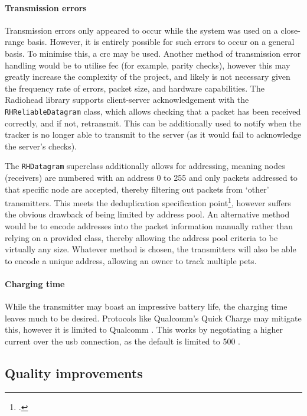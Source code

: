 \paragraph{Transmission errors}
Transmission errors only appeared to occur while the system was
used on a close-range basis. However, it is entirely possible for
such errors to occur on a general basis. To minimise this,
a \acrshort{crc} may be used. Another method of transmission error handling
would be to utilise \acrshort{fec} (for example, parity checks),
however this may greatly increase
the complexity of the project, and likely is not necessary given the
frequency rate of errors, packet size, and hardware capabilities.
The Radiohead library supports client-server acknowledgement
with the \lstinline{RHReliableDatagram} class, which allows
checking that a packet has been received correctly, and if not, retransmit.
This can be additionally used to notify when the tracker is no longer
able to transmit to the server (as it would fail to acknowledge the
server's checks). 

The \lstinline{RHDatagram} superclass additionally allows for addressing, meaning 
nodes (receivers) are numbered with an address 0 to 255 and only packets 
addressed to that specific node are accepted, thereby filtering out packets from 
`other' transmitters. This meets the deduplication specification point\footnote{
    .
}, however suffers the obvious drawback of being limited by address pool. 
An alternative method would be to encode addresses into the packet information manually
rather than relying on a provided class, thereby allowing the address pool criteria 
to be virtually any size. Whatever method is chosen, the transmitters will 
also be able to encode a unique address, allowing an owner to track multiple pets. 

\paragraph{Charging time}
While the transmitter may boast an impressive battery life, the charging
time leaves much to be desired. Protocols like Qualcomm's Quick Charge
may mitigate this, however it is limited to Qualcomm .
This works by negotiating a higher current over the \acrshort{usb} connection,
as the default is limited to \qty{500}{\mAh} \cite{axelson:usb}.

\subsection{Quality improvements}
